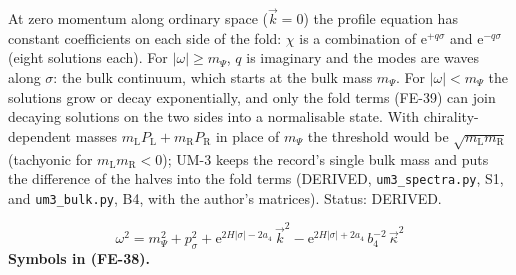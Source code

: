 \documentclass[
  10pt,
]{article}
\begin{document}
At zero momentum along ordinary space (\(\vec k = 0\)) the profile
equation has constant coefficients on each side of the fold: \(\chi\) is
a combination of \(\mathrm{e}^{+q\sigma}\) and \(\mathrm{e}^{-q\sigma}\)
(eight solutions each). For \(\lvert\omega\rvert \ge m_\Psi\), \(q\) is
imaginary and the modes are waves along \(\sigma\): the bulk continuum,
which starts at the bulk mass \(m_\Psi\). For
\(\lvert\omega\rvert < m_\Psi\) the solutions grow or decay
exponentially, and only the fold terms (FE-39) can join decaying
solutions on the two sides into a normalisable state. With
chirality-dependent masses
\(m_{\mathrm{L}}P_{\mathrm{L}} + m_{\mathrm{R}}P_{\mathrm{R}}\) in place
of \(m_\Psi\) the threshold would be
\(\sqrt{m_{\mathrm{L}}m_{\mathrm{R}}}\) (tachyonic for
\(m_{\mathrm{L}}m_{\mathrm{R}} < 0\)); UM-3 keeps the record's single
bulk mass and puts the difference of the halves into the fold terms
(DERIVED, \texttt{um3\_spectra.py}, S1, and \texttt{um3\_bulk.py}, B4,
with the author's matrices). Status: DERIVED.

\[
\omega^2 = m_\Psi^2 + p_\sigma^2 + \mathrm{e}^{2H\lvert\sigma\rvert - 2a_4}\,\vec k^2 - \mathrm{e}^{2H\lvert\sigma\rvert + 2a_4}\,b_4^{-2}\,\vec\kappa^2 \tag{FE-38}
\] \textbf{Symbols in (FE-38).}
\end{document}
